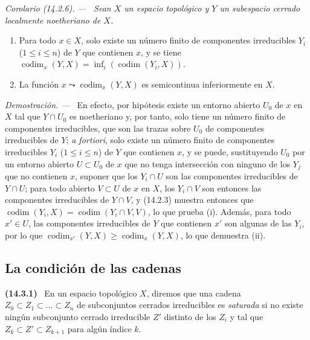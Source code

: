 \documentclass[10pt,oneside]{book}
\makeatletter
\newcommand{\setmanualcurrentlabel}[1]{\def\@currentlabel{#1}}
\newenvironment{env}[1][]{\setmanualcurrentlabel{#1}\par\medskip\noindent\textbf{(#1)}\ }{\par}
\newenvironment{corollary}[1][]{%
  \setmanualcurrentlabel{#1}\par\medskip\noindent\itshape Corolario (#1). ---\ }{\par}
\newenvironment{proof}{%
  \par\medskip\noindent\textit{Demostración. ---\ }}{\par}
\makeatother
\begin{document}
\begin{corollary}[14.2.6]
\label{0.14.2.6-es}
Sean $X$ un espacio topológico y $Y$ un subespacio cerrado localmente
noetheriano de $X$.
\begin{enumerate}
  \item[\rm(i)] Para todo $x\in X$, solo existe un número finito de
  componentes irreducibles $Y_i$ \textup{($1\leq i\leq n$)} de $Y$ que contienen $x$,
  y se tiene
  $\operatorname{codim}_x(Y,X)=
  \inf_i(\operatorname{codim}(Y_i,X))$.
  \item[\rm(ii)] La función
  $x\leadsto\operatorname{codim}_x(Y,X)$ es semicontinua inferiormente en $X$.
\end{enumerate}
\end{corollary}

\begin{proof}
En efecto, por hipótesis existe un entorno abierto $U_0$ de $x$ en $X$ tal
que $Y\cap U_0$ es noetheriano y, por tanto, solo tiene un número finito de
componentes irreducibles, que son las trazas sobre $U_0$ de componentes
irreducibles de $Y$; \emph{a fortiori}, solo existe un número finito de
componentes irreducibles $Y_i$ ($1\leq i\leq n$) de $Y$ que contienen $x$, y
se puede, sustituyendo $U_0$ por un entorno abierto $U\subset U_0$ de $x$ que
no tenga intersección con ninguno de los $Y_j$ que no contienen $x$, suponer
que los $Y_i\cap U$ son las componentes irreducibles de $Y\cap U$; para todo
abierto $V\subset U$ de $x$ en $X$, los $Y_i\cap V$ son entonces las
componentes irreducibles de $Y\cap V$, y (14.2.3) muestra entonces que
$\operatorname{codim}(Y_i,X)=\operatorname{codim}(Y_i\cap V,V)$, lo que
prueba (i). Además, para todo $x'\in U$, las componentes irreducibles de $Y$
que contienen $x'$ son algunas de las $Y_i$, por lo que
$\operatorname{codim}_{x'}(Y,X)\geq\operatorname{codim}_x(Y,X)$, lo que
demuestra (ii).
\end{proof}

\subsection{La condición de las cadenas}
\label{subsection:0.14.3-es}

\begin{env}[14.3.1]
\label{0.14.3.1-es}
En un espacio topológico $X$, diremos que una cadena
$Z_0\subset Z_1\subset\ldots\subset Z_n$ de subconjuntos cerrados irreducibles es
\emph{saturada} si no existe ningún subconjunto cerrado irreducible $Z'$ distinto
de los $Z_i$ y tal que $Z_k\subset Z'\subset Z_{k+1}$ para algún índice $k$.
\end{env}
\end{document}
